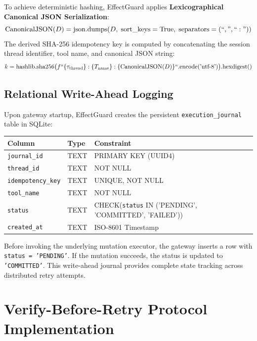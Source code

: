 To achieve deterministic hashing, EffectGuard applies \textbf{Lexicographical Canonical JSON Serialization}:
\begin{equation}
    \text{CanonicalJSON}(D) = \text{json.dumps}(D, \;\text{sort\_keys}=\text{True}, \;\text{separators}=(``,", ``:"))
\end{equation}
The derived SHA-256 idempotency key is computed by concatenating the session thread identifier, tool name, and canonical JSON string:
\begin{equation}
    k = \text{hashlib.sha256}\big(f``\{\tau_{\text{thread}}\}:\{T_{\text{name}}\}:\{\text{CanonicalJSON}(D)\}``.\text{encode}(\text{'utf-8'})\big).\text{hexdigest}()
\end{equation}

\subsection{Relational Write-Ahead Logging}
Upon gateway startup, EffectGuard creates the persistent \texttt{execution\_journal} table in SQLite:
\begin{center}
\begin{tabular}{|l|l|l|}
\hline
\textbf{Column} & \textbf{Type} & \textbf{Constraint} \\
\hline
\texttt{journal\_id} & TEXT & PRIMARY KEY (UUID4) \\
\texttt{thread\_id} & TEXT & NOT NULL \\
\texttt{idempotency\_key} & TEXT & UNIQUE, NOT NULL \\
\texttt{tool\_name} & TEXT & NOT NULL \\
\texttt{status} & TEXT & CHECK(\texttt{status} IN ('PENDING', 'COMMITTED', 'FAILED')) \\
\texttt{created\_at} & TEXT & ISO-8601 Timestamp \\
\hline
\end{tabular}
\end{center}

Before invoking the underlying mutation executor, the gateway inserts a row with \texttt{status = 'PENDING'}. If the mutation succeeds, the status is updated to \texttt{'COMMITTED'}. This write-ahead journal provides complete state tracking across distributed retry attempts.

\section{Verify-Before-Retry Protocol Implementation}

